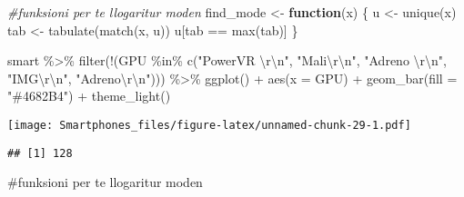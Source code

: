 \documentclass[
]{article}
\newenvironment{Shaded}{\begin{snugshade}}{\end{snugshade}}
\newcommand{\AttributeTok}[1]{\textcolor[rgb]{0.77,0.63,0.00}{#1}}
\newcommand{\CommentTok}[1]{\textcolor[rgb]{0.56,0.35,0.01}{\textit{#1}}}
\newcommand{\ControlFlowTok}[1]{\textcolor[rgb]{0.13,0.29,0.53}{\textbf{#1}}}
\newcommand{\FunctionTok}[1]{\textcolor[rgb]{0.00,0.00,0.00}{#1}}
\newcommand{\NormalTok}[1]{#1}
\newcommand{\OtherTok}[1]{\textcolor[rgb]{0.56,0.35,0.01}{#1}}
\newcommand{\SpecialCharTok}[1]{\textcolor[rgb]{0.00,0.00,0.00}{#1}}
\newcommand{\StringTok}[1]{\textcolor[rgb]{0.31,0.60,0.02}{#1}}
\begin{document}
\begin{Shaded}
\begin{Highlighting}[]
\CommentTok{\#funksioni per te llogaritur moden}
\NormalTok{find\_mode }\OtherTok{\textless{}{-}} \ControlFlowTok{function}\NormalTok{(x) \{}
\NormalTok{  u }\OtherTok{\textless{}{-}} \FunctionTok{unique}\NormalTok{(x)}
\NormalTok{  tab }\OtherTok{\textless{}{-}} \FunctionTok{tabulate}\NormalTok{(}\FunctionTok{match}\NormalTok{(x, u))}
\NormalTok{  u[tab }\SpecialCharTok{==} \FunctionTok{max}\NormalTok{(tab)]}
\NormalTok{\}}

\NormalTok{smart }\SpecialCharTok{\%\textgreater{}\%}
 \FunctionTok{filter}\NormalTok{(}\SpecialCharTok{!}\NormalTok{(GPU }\SpecialCharTok{\%in\%} \FunctionTok{c}\NormalTok{(}\StringTok{"PowerVR }\SpecialCharTok{\textbackslash{}r\textbackslash{}n}\StringTok{"}\NormalTok{, }\StringTok{"Mali}\SpecialCharTok{\textbackslash{}r\textbackslash{}n}\StringTok{"}\NormalTok{, }\StringTok{"Adreno }\SpecialCharTok{\textbackslash{}r\textbackslash{}n}\StringTok{"}\NormalTok{, }\StringTok{"IMG}\SpecialCharTok{\textbackslash{}r\textbackslash{}n}\StringTok{"}\NormalTok{, }\StringTok{"Adreno}\SpecialCharTok{\textbackslash{}r\textbackslash{}n}\StringTok{"}\NormalTok{))) }\SpecialCharTok{\%\textgreater{}\%}
 \FunctionTok{ggplot}\NormalTok{() }\SpecialCharTok{+}
  \FunctionTok{aes}\NormalTok{(}\AttributeTok{x =}\NormalTok{ GPU) }\SpecialCharTok{+}
  \FunctionTok{geom\_bar}\NormalTok{(}\AttributeTok{fill =} \StringTok{"\#4682B4"}\NormalTok{) }\SpecialCharTok{+}
  \FunctionTok{theme\_light}\NormalTok{()}
\end{Highlighting}
\end{Shaded}

\texttt{[image: Smartphones\_files/figure-latex/unnamed-chunk-29-1.pdf]}

\begin{Shaded}
\end{Shaded}

\begin{verbatim}
## [1] 128
\end{verbatim}

\#funksioni per te llogaritur moden
\end{document}
